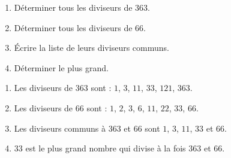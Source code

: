 \begin{exercice*}
    \begin{enumerate}
        \item Déterminer tous les diviseurs de $363$.
        \item Déterminer tous les diviseurs de $66$.
        \item Écrire la liste de leurs diviseurs communs.
        \item Déterminer le plus grand.
    \end{enumerate}

\end{exercice*}
\begin{corrige}
    \begin{enumerate}
        \item Les diviseurs de $363$ sont : $1$, $3$, $11$, $33$, $121$, $363$.
        \item Les diviseurs de 66 sont : $1$, $2$, $3$, $6$, $11$, $22$, $33$, $66$.
        \item Les diviseurs communs à $363$ et $66$ sont $1$, $3$, $11$, $33$ et $66$.
        \item $33$ est le plus grand nombre qui divise à la fois $363$ et $66$.
    \end{enumerate}
\end{corrige}

